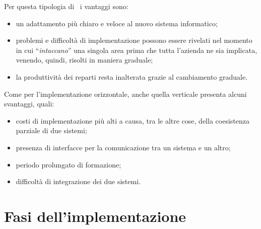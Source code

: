 	Per questa tipologia di \rollout~i vantaggi sono:
	\begin{itemize}[noitemsep]
		\renewcommand\labelitemi{--}
		\item un adattamento più chiaro e veloce al nuovo sistema informatico;
		\item problemi e difficoltà di implementazione possono essere rivelati nel momento in cui ``\textit{intaccano}'' una singola area prima che tutta l'azienda ne sia implicata, venendo, quindi, risolti in maniera graduale;
		\item la produttività dei reparti resta inalterata grazie al cambiamento graduale.
	\end{itemize}

	Come per l'implementazione orizzontale, anche quella verticale presenta alcuni svantaggi, quali:
	\begin{itemize}[noitemsep]
		\renewcommand\labelitemi{--}
		\item costi di implementazione più alti a causa, tra le altre cose, della coesistenza parziale di due sistemi;
		\item presenza di interfacce per la comunicazione tra un sistema e un altro;
		\item periodo prolungato di formazione;
		\item difficoltà di integrazione dei due sistemi.
	\end{itemize}

\section{Fasi dell'implementazione}\label{sec:fasi}

